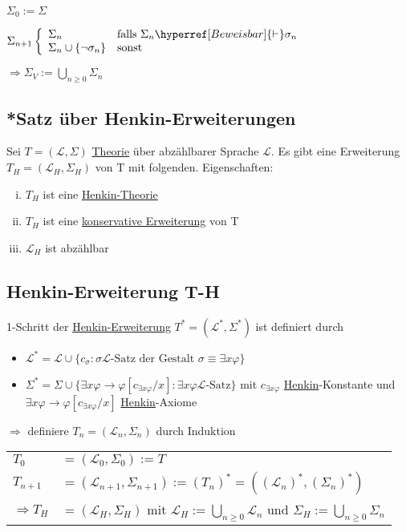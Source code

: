 \documentclass[12pt,a4paper]{article} %
\begin{document}
	$\Sigma_0 := \Sigma$
	
	$\Sigma_{n + 1} \left\lbrace 
		\begin{array}{l l}
			\Sigma_n & \text{falls } \Sigma_n \hyperref[Beweisbar]{\vdash} \sigma_n \\
			\Sigma_n \cup \{\neg \sigma_n\} & \text{sonst}
		\end{array}
	\right.$
	
	$\Rightarrow \Sigma_V := \bigcup\limits_{n \ge 0} \Sigma_n$
	
	\subsection{*Satz über Henkin-Erweiterungen}
	\label{HenkinErweiterung}
	Sei $T = (\mathcal{L}, \Sigma)$ \hyperref[Theorie]{Theorie} über abzählbarer Sprache $\mathcal{L}$. Es gibt eine Erweiterung $T_H = (\mathcal{L}_H, \Sigma_H)$ von T mit folgenden. \newline 
	Eigenschaften:
	
	\begin{enumerate}[(i)]
		\item $T_H$ ist eine \hyperref[Henkin]{Henkin-Theorie}
		\item $T_H$ ist eine \hyperref[Erweiterung]{konservative Erweiterung} von T
		\item $\mathcal{L}_H$ ist abzählbar
	\end{enumerate}

	\subsection{Henkin-Erweiterung T-H}
	1-Schritt der \hyperref[HenkinErweiterung]{Henkin-Erweiterung} $T^* = (\mathcal{L}^*, \Sigma^*)$ ist definiert durch
	\begin{itemize}
		\item $\mathcal{L}^* = \mathcal{L} \cup \{c_{\sigma} : \sigma \hyperref[LSatz]{\mathcal{L} \text{-Satz}} \text{ der Gestalt } \sigma \equiv \exists x  \varphi\}$
		\item $\Sigma^* = \Sigma \cup \{\exists x \varphi \rightarrow \varphi[c_{\exists x \varphi}/x] : \exists x \varphi \hyperref[LSatz]{\mathcal{L} \text{-Satz}}\}$ mit $c_{\exists x \varphi}$ \hyperref[Henkin]{Henkin}-Konstante und $\exists x \varphi \rightarrow \varphi[c_{\exists x \varphi}/x]$ \hyperref[Henkin]{Henkin}-Axiome 
	\end{itemize}
	$\Rightarrow$ definiere $T_n = (\mathcal{L}_n, \Sigma_n)$ durch Induktion \newline
	\begin{tabular}{l l}
		$T_0$ & $= (\mathcal{L}_0, \Sigma_0) := T$ \\
		$T_{n + 1}$ & $= (\mathcal{L}_{n + 1}, \Sigma_{n + 1}) := (T_n)^* = ((\mathcal{L}_n)^*, (\Sigma_n)^*)$ \\
		$\Rightarrow T_H$ & $= (\mathcal{L}_H, \Sigma_H)$ mit $\mathcal{L}_H := \bigcup\limits_{n \ge 0} \mathcal{L}_n$ und $\Sigma_H := \bigcup\limits_{n \ge 0} \Sigma_n$
	\end{tabular}
	
\end{document}
